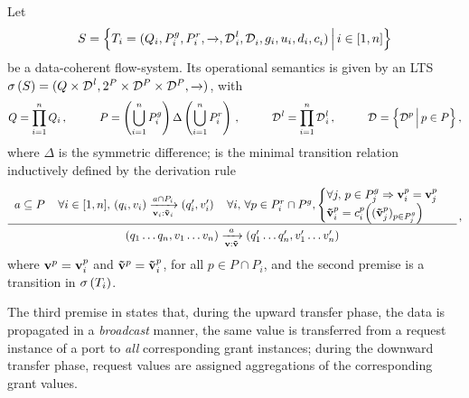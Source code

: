 \begin{definition}
  \label{defn:flow:semantics}
  Let \[S = \Setdef{T_i = (Q_i, \pin_i, \pout_i, \goesto{},
    \local{\data}_i, \data_i, \guard_i, \up_i, \down_i, \combine_i)}{i \in
    [1,n]}\] be a data-coherent flow-system.  Its operational semantics is
  given by an LTS $\undata{S} = (Q \times \local{\data}, 2^P \times
  \data[P] \times \data[P], \goesto{})$, with
  \begin{equation}
    \label{eq:flow:parts}
    Q = \prod_{i=1}^n Q_i\,,
    \hspace{1cm}
    P = \left(\bigcup_{i=1}^n \pin_i\right) 
      \Delta 
      \left(\bigcup_{i=1}^n \pout_i\right)\,,
    \hspace{1cm}
    \local{\data} = \prod_{i=1}^n \local{\data}_i\,,
    \hspace{1cm}
    \data = \Setdef{\data[p]}{p \in P}\,,
  \end{equation}
  where $\Delta$ is the symmetric difference; \goesto{} is the minimal
  transition relation inductively defined by the derivation rule
  \begin{equation}
    \label{eq:flow:semantics}
    \renewcommand{\arraystretch}{1.5}
    \derrule[3]{
      a \subseteq P
      &
      \forall i \in [1,n],\,
      (q_i,v_i) 
      \goesto[\portdata{v}_i:\portdata{\tilde{v}}_i]{a \cap P_i}
      (q_i', v_i')
      &
      \forall i,\,
      \forall p \in \pout_i \cap \pin,
      \begin{cases}
      \forall j,\, p \in \pin_j \Rightarrow 
      \portdata{v}_i^p = \portdata{v}_j^p\\
      \portdata{\tilde{v}}^p_i = 
      \combine[p]_i \Big((\portdata{\tilde{v}}^p_j)_{p \in \pin_j}\Big)\\
      \end{cases}
    }{      
      (q_1\dots q_n, v_1\dots v_n)
      \goesto[\portdata{v}:\portdata{\tilde{v}}]{a}
      (q_1'\dots q_n', v_1'\dots v_n')
    }\,,
  \end{equation}
  where $\portdata{v}^p = \portdata{v}^p_i$ and $\portdata{\tilde{v}}^p =
  \portdata{\tilde{v}}^p_i$, for all $p \in P \cap P_i$, and the second
  premise is a transition in $\undata{T_i}$.
\end{definition}

The third premise in  states that, during the upward
transfer phase, the data is propagated in a \emph{broadcast} manner, \ie
the same value is transferred from a request instance of a port to
\emph{all} corresponding grant instances; during the downward transfer
phase, request values are assigned aggregations of the corresponding grant
values. 


